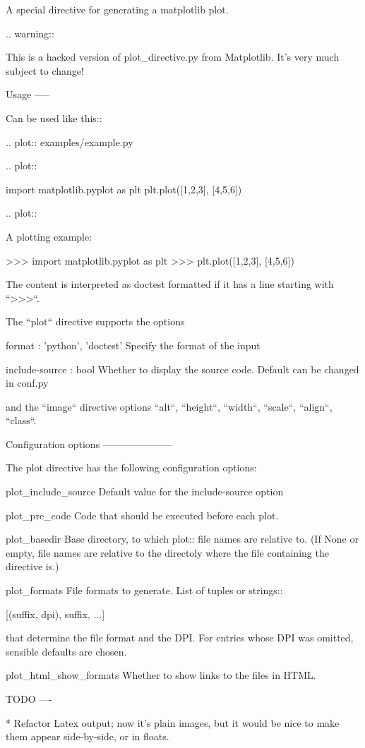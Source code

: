 \begin{DoxyVerb}A special directive for generating a matplotlib plot.

.. warning::

   This is a hacked version of plot_directive.py from Matplotlib.
   It's very much subject to change!


Usage
-----

Can be used like this::

    .. plot:: examples/example.py

    .. plot::

       import matplotlib.pyplot as plt
       plt.plot([1,2,3], [4,5,6])

    .. plot::

       A plotting example:

       >>> import matplotlib.pyplot as plt
       >>> plt.plot([1,2,3], [4,5,6])

The content is interpreted as doctest formatted if it has a line starting
with ``>>>``.

The ``plot`` directive supports the options

    format : {'python', 'doctest'}
        Specify the format of the input

    include-source : bool
        Whether to display the source code. Default can be changed in conf.py

and the ``image`` directive options ``alt``, ``height``, ``width``,
``scale``, ``align``, ``class``.

Configuration options
---------------------

The plot directive has the following configuration options:

    plot_include_source
        Default value for the include-source option

    plot_pre_code
        Code that should be executed before each plot.

    plot_basedir
        Base directory, to which plot:: file names are relative to.
        (If None or empty, file names are relative to the directoly where
        the file containing the directive is.)

    plot_formats
        File formats to generate. List of tuples or strings::

            [(suffix, dpi), suffix, ...]

        that determine the file format and the DPI. For entries whose
        DPI was omitted, sensible defaults are chosen.

    plot_html_show_formats
        Whether to show links to the files in HTML.

TODO
----

* Refactor Latex output; now it's plain images, but it would be nice
  to make them appear side-by-side, or in floats.\end{DoxyVerb}
 

